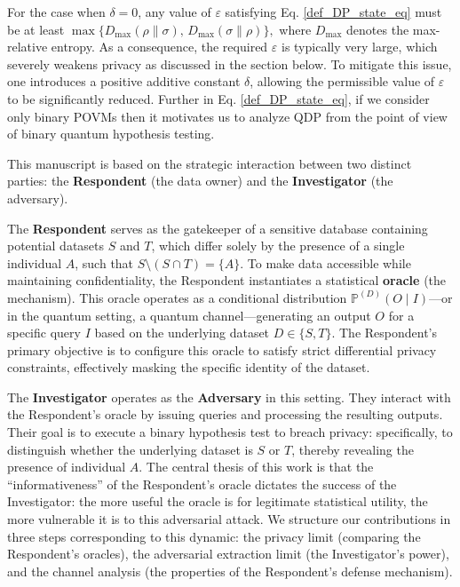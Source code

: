 \documentclass[onecolumn,ldraftcls, 11pt]{IEEEtran}
\newcommand{\eps}{\varepsilon}
\begin{document}
For the case when $\delta = 0$, any value of $\eps$ satisfying Eq. \eqref{def_DP_state_eq} must be at least $\max\{D_{\max}(\rho\|\sigma),\, D_{\max}(\sigma\|\rho)\},$ where $D_{\max}$ denotes the max-relative entropy. As a consequence, the required $\eps$ is typically very large, which severely weakens privacy as discussed in the section below. To mitigate this issue, one introduces a positive additive constant $\delta$, allowing the permissible value of $\eps$ to be significantly reduced. Further in Eq. \eqref{def_DP_state_eq}, if we consider only binary POVMs then it motivates us to analyze QDP from the point of view of binary quantum hypothesis testing.

This manuscript is based on the strategic interaction between two distinct parties: the \textbf{Respondent} (the data owner) and the \textbf{Investigator} (the adversary).

The \textbf{Respondent} serves as the gatekeeper of a sensitive database containing potential datasets $S$ and $T$, which differ solely by the presence of a single individual $A$, such that $S \setminus (S \cap T) = \{A\}$. To make data accessible while maintaining confidentiality, the Respondent instantiates a statistical \textbf{oracle} (the mechanism). This oracle operates as a conditional distribution $\mathbb{P}^{(D)}(O\mid I)$---or in the quantum setting, a quantum channel---generating an output $O$ for a specific query $I$ based on the underlying dataset $D \in \{S,T\}$. The Respondent's primary objective is to configure this oracle to satisfy strict differential privacy constraints, effectively masking the specific identity of the dataset.

The \textbf{Investigator} operates as the \textbf{Adversary} in this setting. They interact with the Respondent's oracle by issuing queries and processing the resulting outputs. Their goal is to execute a binary hypothesis test to breach privacy: specifically, to distinguish whether the underlying dataset is $S$ or $T$, thereby revealing the presence of individual $A$. The central thesis of this work is that the ``informativeness'' of the Respondent's oracle dictates the success of the Investigator: the more useful the oracle is for legitimate statistical utility, the more vulnerable it is to this adversarial attack. We structure our contributions in three steps corresponding to this dynamic: the privacy limit (comparing the Respondent's oracles), the adversarial extraction limit (the Investigator's power), and the channel analysis (the properties of the Respondent's defense mechanism).
\end{document}
